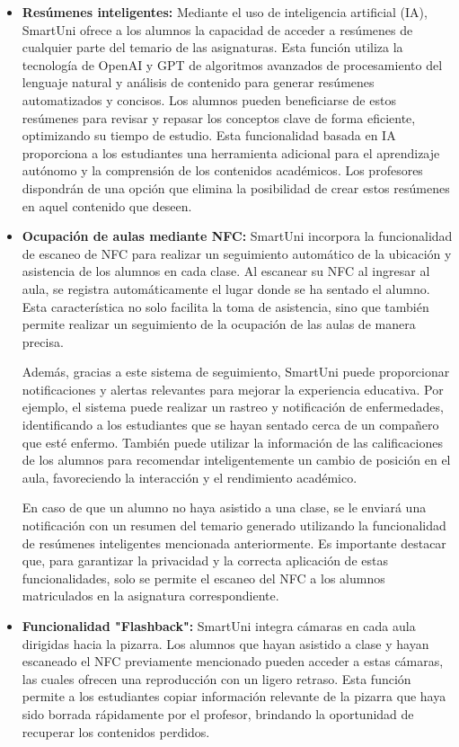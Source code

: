 \documentclass[12pt]{report}
\begin{document}
\begin{itemize}
\item \textbf{Resúmenes inteligentes:} Mediante el uso de inteligencia artificial (IA), SmartUni ofrece a los alumnos la capacidad de acceder a resúmenes de cualquier parte del temario de las asignaturas. Esta función utiliza la tecnología de OpenAI y GPT de algoritmos avanzados de procesamiento del lenguaje natural y análisis de contenido para generar resúmenes automatizados y concisos. Los alumnos pueden beneficiarse de estos resúmenes para revisar y repasar los conceptos clave de forma eficiente, optimizando su tiempo de estudio. Esta funcionalidad basada en IA proporciona a los estudiantes una herramienta adicional para el aprendizaje autónomo y la comprensión de los contenidos académicos. Los profesores dispondrán de una opción que elimina la posibilidad de crear estos resúmenes en aquel contenido que deseen.

\item \textbf{Ocupación de aulas mediante NFC:} SmartUni incorpora la funcionalidad de escaneo de NFC para realizar un seguimiento automático de la ubicación y asistencia de los alumnos en cada clase. Al escanear su NFC al ingresar al aula, se registra automáticamente el lugar donde se ha sentado el alumno. Esta característica no solo facilita la toma de asistencia, sino que también permite realizar un seguimiento de la ocupación de las aulas de manera precisa.

Además, gracias a este sistema de seguimiento, SmartUni puede proporcionar notificaciones y alertas relevantes para mejorar la experiencia educativa. Por ejemplo, el sistema puede realizar un rastreo y notificación de enfermedades, identificando a los estudiantes que se hayan sentado cerca de un compañero que esté enfermo. También puede utilizar la información de las calificaciones de los alumnos para recomendar inteligentemente un cambio de posición en el aula, favoreciendo la interacción y el rendimiento académico.

En caso de que un alumno no haya asistido a una clase, se le enviará una notificación con un resumen del temario generado utilizando la funcionalidad de resúmenes inteligentes mencionada anteriormente. Es importante destacar que, para garantizar la privacidad y la correcta aplicación de estas funcionalidades, solo se permite el escaneo del NFC a los alumnos matriculados en la asignatura correspondiente.

\item \textbf{Funcionalidad "Flashback":} SmartUni integra cámaras en cada aula dirigidas hacia la pizarra. Los alumnos que hayan asistido a clase y hayan escaneado el NFC previamente mencionado pueden acceder a estas cámaras, las cuales ofrecen una reproducción con un ligero retraso. Esta función permite a los estudiantes copiar información relevante de la pizarra que haya sido borrada rápidamente por el profesor, brindando la oportunidad de recuperar los contenidos perdidos.


\end{itemize}
\end{document}
